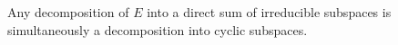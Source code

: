 Any decomposition of $E$ into a direct sum of irreducible subspaces is simultaneously a decomposition into cyclic subspaces.

